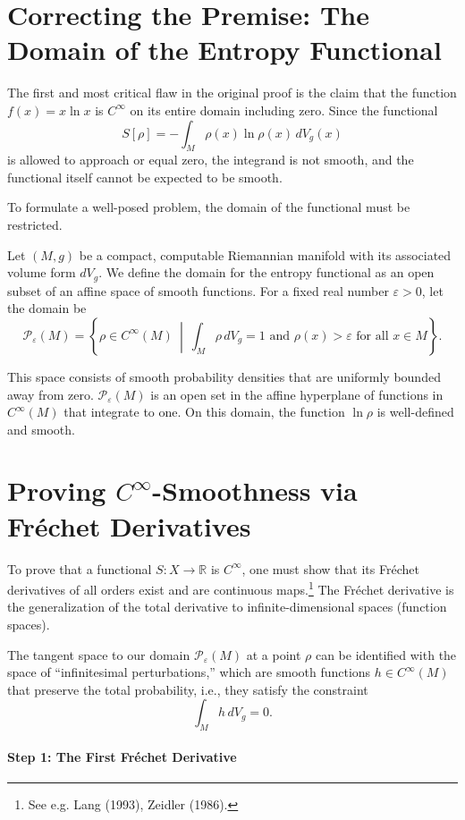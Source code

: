 \documentclass[12pt, a4paper]{article}
\begin{document}
\section*{Correcting the Premise: The Domain of the Entropy Functional}

The first and most critical flaw in the original proof is the claim that the function $f(x) = x \ln x$ is $C^\infty$ on its entire domain including zero. Since the functional
\[
S[\rho] = - \int_M \rho(x) \ln \rho(x) \, dV_g(x)
\]
is allowed to approach or equal zero, the integrand is not smooth, and the functional itself cannot be expected to be smooth.

To formulate a well-posed problem, the domain of the functional must be restricted.

Let $(M,g)$ be a compact, computable Riemannian manifold with its associated volume form $dV_g$. We define the domain for the entropy functional as an open subset of an affine space of smooth functions. For a fixed real number $\varepsilon > 0$, let the domain be
\[
\mathcal{P}_\varepsilon(M) = \left\{ \rho \in C^\infty(M) \ \middle| \ \int_M \rho \, dV_g = 1 \text{ and } \rho(x) > \varepsilon \text{ for all } x \in M \right\}.
\]

This space consists of smooth probability densities that are uniformly bounded away from zero. $\mathcal{P}_\varepsilon(M)$ is an open set in the affine hyperplane of functions in $C^\infty(M)$ that integrate to one. On this domain, the function $\ln \rho$ is well-defined and smooth.

\section*{Proving $C^\infty$-Smoothness via Fréchet Derivatives}

To prove that a functional $S : X \to \mathbb{R}$ is $C^\infty$, one must show that its Fréchet derivatives of all orders exist and are continuous maps.\footnote{See e.g. Lang (1993), Zeidler (1986).} The Fréchet derivative is the generalization of the total derivative to infinite-dimensional spaces (function spaces).

The tangent space to our domain $\mathcal{P}_\varepsilon(M)$ at a point $\rho$ can be identified with the space of ``infinitesimal perturbations,'' which are smooth functions $h \in C^\infty(M)$ that preserve the total probability, i.e., they satisfy the constraint
\[
\int_M h \, dV_g = 0.
\]

\paragraph{Step 1: The First Fréchet Derivative}
\end{document}
